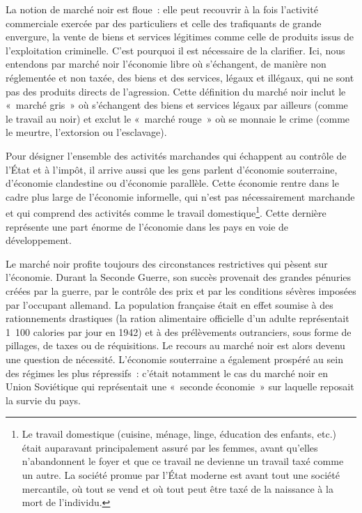 La notion de marché noir est floue~: elle peut recouvrir à la fois l'activité commerciale exercée par des particuliers et celle des trafiquants de grande envergure, la vente de biens et services légitimes comme celle de produits issus de l'exploitation criminelle. C'est pourquoi il est nécessaire de la clarifier. Ici, nous entendons par marché noir l'économie libre où s'échangent, de manière non réglementée et non taxée, des biens et des services, légaux et illégaux, qui ne sont pas des produits directs de l'agression. Cette définition du marché noir inclut le «~marché gris~» où s'échangent des biens et services légaux par ailleurs (comme le travail au noir) et exclut le «~marché rouge~» où se monnaie le crime (comme le meurtre, l'extorsion ou l'esclavage). %

Pour désigner l'ensemble des activités marchandes qui échappent au contrôle de l'État et à l'impôt, il arrive aussi que les gens parlent d'économie souterraine, d'économie clandestine ou d'économie parallèle. Cette économie rentre dans le cadre plus large de l'économie informelle, qui n'est pas nécessairement marchande et qui comprend des activités comme le travail domestique\footnote{Le travail domestique (cuisine, ménage, linge, éducation des enfants, etc.) était auparavant principalement assuré par les femmes, avant qu'elles n'abandonnent le foyer et que ce travail ne devienne un travail taxé comme un autre. La société promue par l'État moderne est avant tout une société mercantile, où tout se vend et où tout peut être taxé de la naissance à la mort de l'individu.}. Cette dernière représente une part énorme de l'économie dans les pays en voie de développement.

Le marché noir profite toujours des circonstances restrictives qui pèsent sur l'économie. Durant la Seconde Guerre, son succès provenait des grandes pénuries créées par la guerre, par le contrôle des prix et par les conditions sévères imposées par l'occupant allemand. La population française était en effet soumise à des rationnements drastiques (la ration alimentaire officielle d'un adulte représentait 1~100 calories par jour en 1942) et à des prélèvements outranciers, sous forme de pillages, de taxes ou de réquisitions. Le recours au marché noir est alors devenu une question de nécessité. L'économie souterraine a également prospéré au sein des régimes les plus répressifs~: c'était notamment le cas du marché noir en Union Soviétique qui représentait une «~seconde économie~» sur laquelle reposait la survie du pays.

